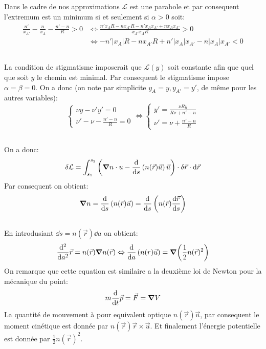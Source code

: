 \documentclass[10pt,a4paper]{article}
\begin{document}
\subsection{}
Dans le cadre de nos approximations $\mathcal{L}$ est une parabole et par consequent l'extremum est un minimum si et seulement si $\alpha > 0$ soit:
\begin{align*}
\frac{n'}{x_{A'}} - \frac{n}{x_A} - \frac{n' - n}{R} > 0 &\Leftrightarrow \frac{n' x_A R - n x_{A'} R - n' x_A x_{A'} + n x_{A} x_{A'}}{x_{A'}x_A R} > 0\\
&\Leftrightarrow -n'|x_A|R - n x_{A'} R + n' |x_A| x_{A'} - n |x_A| x_{A'} < 0
\end{align*}

\subsection{}
La condition de stigmatisme imposerait que $\mathcal{L}(y)$ soit constante afin que quel que soit $y$ le chemin est minimal. Par consequent le stigmatisme impose $\alpha = \beta = 0$. On a donc (on note par simplicite $y_A = y, y_{A'} = y'$, de même pour les autres variables):
\[
\begin{cases}
\nu y - \nu' y' = 0\\
\nu' - \nu - \frac{n' - n}{R} = 0
\end{cases}
\Leftrightarrow
\begin{cases}
y' = \frac{\nu R y}{R\nu + n' - n}\\
\nu' = \nu + \frac{n' - n}{R}
\end{cases}
\]
\subsection{}
\subsection{}
On a donc:
\[
\delta\mathcal{L} = \int_{s_1}^{s_2} \left( \grad n \cdot u - \dv{}{s}\left(n(\vec{r}) \vec{u}\right) \vec{u} \right) \cdot \delta \vec{r} \cdot \dd \vec{r}
\]
Par consequent on obtient:
\[
\grad n = \dv{}{s} \left(n(\vec{r})\vec{u}\right) = \dv{}{s}\left(n(\vec{r})\dv{\vec{r}}{s}\right)
\]
\subsection{}
En introdusiant $\dd s = n(\vec{r})\dd a$ on obtient:
\[
\dv[2]{}{a} \vec{r} = n(\vec{r})\grad n(\vec{r}) \Leftrightarrow \dv{}{a} \left( n(r) \vec{u}\right) = \grad(\frac{1}{2}n(\vec{r})^2)
\]
On remarque que cette equation est similaire a la deuxième loi de Newton pour la mécanique du point:
\[
m \dv{}{t} \vec{p} = \vec{F} = \grad V
\]
La quantité de mouvement à pour equivalent optique $n(\vec{r}) \vec{u}$, par consequent le moment cinétique est donnée par $n(\vec{r}) \vec{r} \times \vec{u}$. Et finalement l'énergie potentielle est donnée par $\frac{1}{2}n(\vec{r})^2$. 
\end{document}
